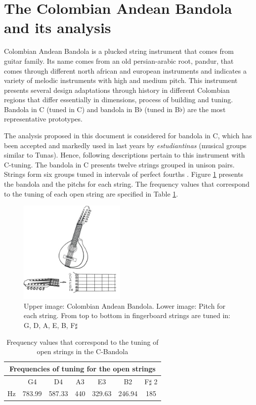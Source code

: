 \section{The Colombian Andean Bandola and its analysis}

Colombian Andean Bandola is a plucked string instrument that comes from guitar family. Its name comes from an old persian-arabic root, pandur, that comes through different north african and european instruments and indicates a variety of melodic instruments with high and medium pitch. This instrument presents several design adaptations through history in different Colombian regions that differ essentially in dimensions, process of building and tuning. Bandola in C (tuned in C) and bandola in B$\flat$ (tuned in B$\flat$) are the most representative prototypes.

The analysis proposed in this document is considered for bandola in C, which has been accepted and markedly used in last years by \textit{estudiantinas} (musical groups similar to Tunas). Hence, following descriptions pertain to this instrument with C-tuning. The bandola in C presents twelve strings grouped in unison pairs. Strings form six groups tuned in intervals of perfect fourths \cite{thesis:bandola}. Figure \ref{Bandola} presents the bandola and the pitchs for each string. The frequency values that correspond to the tuning of each open string are specified in Table \ref{StringTuning}.

\begin{figure}[h]
\centering
\includegraphics[height=5cm]{img/bandola.png}
\caption[Description of a Colombian Andean Bandola]{Upper image: Colombian Andean Bandola. Lower image: Pitch for each string. From top to bottom in fingerboard strings are tuned in: G, D, A, E, B, F$\sharp$}
\label{Bandola}
\end{figure}

\begin{table}[htb]
\centering
\begin{tabular}{|c|c|c|c|c|c|c|}\hline
\multicolumn{7}{|c|}{\vphantom{\LARGE Ap} Frequencies of tuning for the open strings}\\ \hline\hline
 & G4& D4 & A3 & E3 & B2 & F$\sharp$ 2\\ \hline
Hz & 783.99 & 587.33 & 440 & 329.63 & 246.94 & 185 \\ \hline
\end{tabular}
\caption{Frequency values that correspond to the tuning of open strings in the C-Bandola}
\label{StringTuning}
\end{table}  


